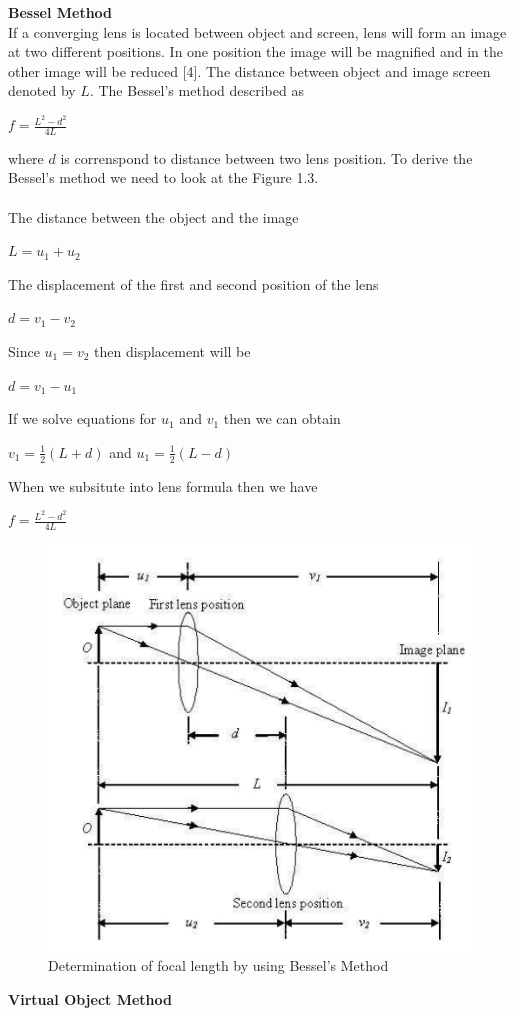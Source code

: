 \documentclass[a4paper,12pt]{report}
\begin{document}
\textbf{Bessel Method}\\
If a converging lens is located between object and screen, lens will form an image at two different positions. In one position the image will be magnified and in the other image will be reduced [4]. The distance between object and image screen denoted by $L$. The Bessel's method described as
\begin{center}
	{\Large $f=\frac{L^{2}-d^{2}}{4L}$}
\end{center}
where $d$ is correnspond to distance between two lens position. To derive the Bessel's method we need to look at the Figure 1.3.
\\\\
The distance between the object and the image
\begin{center}
	$L=u_{1}+u_{2}$
\end{center}
The displacement of the first and second position of the lens
\begin{center}
	$d=v_{1}-v_{2}$
\end{center}
Since $u_{1}=v_{2}$ then displacement will be
\begin{center}
	$d=v_{1}-u_{1}$
\end{center} 
If we solve equations for $u_{1}$ and $v_{1}$ then we can obtain
\begin{center}
	$v_{1}=\frac{1}{2}(L+d)$
and
	$u_{1}=\frac{1}{2}(L-d)$
\end{center}
When we subsitute into lens formula then we have
\begin{center}
{\Large 	$f=\frac{L^{2}-d^{2}}{4L}$}
\end{center}
\begin{figure}[h]
\centering
\includegraphics[width=0.50\linewidth, height=0.23\textheight]{Bessel}
\caption{Determination of focal length by using Bessel's Method}
\label{fig:Bessel}
\end{figure}
\newpage
\textbf{Virtual Object Method}
\end{document}

